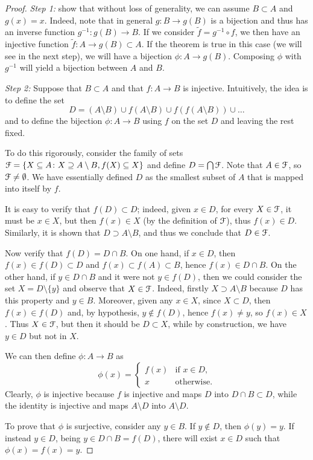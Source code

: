\begin{proof}
\emph{Step 1:} show that without loss of generality, we can assume $B\subset A$ and $g(x)=x$. Indeed, note that in general $g\colon B\to g(B)$ is a bijection and thus has an inverse function $g^{-1}\colon g(B)\to B$. If we consider $\tilde f = g^{-1}\circ f$, we then have an injective function $\tilde f\colon A \to g(B)\subset A$. If the theorem is true in this case (we will see in the next step), we will have a bijection $\phi\colon A\to g(B)$. Composing $\phi$ with $g^{-1}$ will yield a bijection between $A$ and $B$.

\emph{Step 2:} Suppose that $B\subset A$ and that $f\colon A \to B$ is injective. Intuitively, the idea is to define the set
\[
 D = (A\setminus B)  
 \cup f(A\setminus B) 
 \cup f(f(A\setminus B)) 
 \cup \dots
\]
and to define the bijection $\phi \colon A \to B$ using $f$ on the set $D$ and
leaving the rest fixed.

To do this rigorously, consider the family of sets $\mathcal F = \{X \subseteq A \colon X
\supseteq A \setminus B, f(X) \subseteq X\}$ and define $D = \bigcap \mathcal F$. Note that
$A \in \mathcal F$, so $\mathcal F\neq \emptyset$. We have essentially defined $D$ as the
smallest subset of $A$ that is mapped into itself by $f$.

It is easy to verify that $f(D) \subset D$; indeed, given $x\in D$, for every
$X\in \mathcal F$, it must be $x\in X$, but then $f(x) \in X$ (by the definition of
$\mathcal F$), thus $f(x) \in D$. Similarly, it is shown that $D\supset A\setminus B$,
and thus we conclude that $D\in \mathcal F$.

Now verify that $f(D)=D\cap B$. On one hand, if $x\in D$, then $f(x) \in
f(D)\subset D$ and $f(x)\subset f(A)\subset B$, hence $f(x) \in D\cap B$. On the
other hand, if $y\in D \cap B$ and it were not $y \in f(D)$, then we could
consider the set $X=D\setminus\{y\}$ and observe that $X\in \mathcal F$. Indeed, firstly
$X \supset A \setminus B$ because $D$ has this property and $y \in B$. Moreover,
given any $x \in X$, since $X\subset D$, then $f(x) \in f(D)$ and, by
hypothesis, $y\not \in f(D)$, hence $f(x)\neq y$, so $f(x) \in X$. Thus $X\in
\mathcal F$, but then it should be $D\subset X$, while by construction, we have $y\in D$
but not in $X$.


We can then define $\phi \colon A \to B$ as
\[
\phi(x) =
\begin{cases}
   f(x) & \text{if $x\in D$}, \\
   x & \text{otherwise.}
\end{cases}
\]
Clearly, $\phi$ is injective because $f$ is injective and maps $D$ into $D\cap B
\subset D$, while the identity is injective and maps $A\setminus D$ into
$A\setminus D$.

To prove that $\phi$ is surjective, consider any $y \in B$. If $y\not \in D$,
then $\phi(y)=y$. If instead $y\in D$, being $y\in D\cap B = f(D)$, there will
exist $x\in D$ such that $\phi(x) = f(x) = y$.
\end{proof}